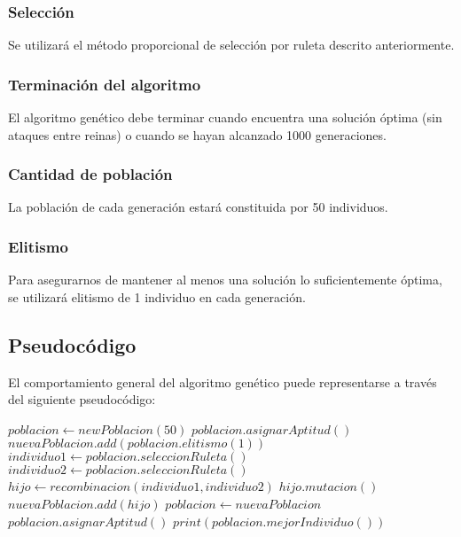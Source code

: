 \subsubsection{Selecci\'on}

Se utilizará el método proporcional de selección por ruleta descrito anteriormente.

\subsubsection{Terminaci\'on del algoritmo}

El algoritmo genético debe terminar cuando encuentra una solución óptima (sin ataques entre reinas) o cuando se hayan alcanzado 1000 generaciones.

\subsubsection{Cantidad de poblaci\'on}

La población de cada generación estará constituida por 50 individuos.

\subsubsection{Elitismo}

Para asegurarnos de mantener al menos una solución lo suficientemente óptima, se utilizará elitismo de 1 individuo en cada generación.

\subsection{Pseudoc\'odigo}

El comportamiento general del algoritmo genético puede representarse a través del siguiente pseudocódigo:\medskip

\begin{algorithmic}
  \State $poblacion\gets new Poblacion(50)$
  \State $poblacion.asignarAptitud()$
    \State $nuevaPoblacion.add(poblacion.elitismo(1))$
      \State $individuo1\gets poblacion.seleccionRuleta()$
      \State $individuo2\gets poblacion.seleccionRuleta()$
      \State $hijo\gets recombinacion(individuo1, individuo2)$
      \State $hijo.mutacion()$
      \State $nuevaPoblacion.add(hijo)$
    \EndWhile
    \State $poblacion\gets nuevaPoblacion$
    \State $poblacion.asignarAptitud()$
  \EndWhile
  \State $print(poblacion.mejorIndividuo())$
\end{algorithmic}

